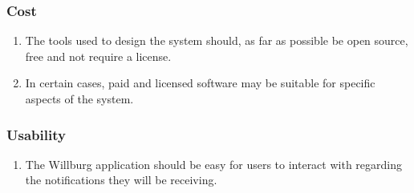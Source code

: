 \subsubsection{Cost}
\begin{enumerate}
	\item The tools used to design the system should, as far as possible be open source, free and not require a license.
	\item In certain cases, paid and licensed software may be suitable for specific aspects of the system. 
\end{enumerate}
\subsubsection{Usability}
\begin{enumerate}
	\item The Willburg application should be easy for users to interact with regarding the notifications they will be receiving.
\end{enumerate}